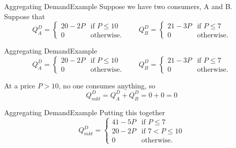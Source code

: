 \documentclass[12pt,t]{beamer}
\begin{document}
\begin{frame}{Aggregating Demand}{Example}
  Suppose we have two consumers, A and B. Suppose that
  $$
    Q_A^D =
    \begin{cases}
      20 - 2P & \text{if } P \leq 10 \\
      0       & \text{otherwise}.
    \end{cases}
    \quad\quad
    Q_B^D =
    \begin{cases}
      21 - 3P & \text{if } P  \leq 7 \\
      0       & \text{otherwise}.
    \end{cases}
  $$

  \bigskip
\end{frame}

\begin{frame}{Aggregating Demand}{Example}
  $$
    Q_A^D =
    \begin{cases}
      20 - 2P & \text{if } P \leq 10 \\
      0       & \text{otherwise}.
    \end{cases}
    \quad\quad
    Q_B^D =
    \begin{cases}
      21 - 3P & \text{if } P  \leq 7 \\
      0       & \text{otherwise}.
    \end{cases}
  $$

  \vspace{10mm}


   {
    At a price $P > 10$, no one consumes anything, so 
    $$Q^D_{mkt} = Q_A^D + Q_B^D = 0 + 0 = 0$$ 
  }
\end{frame}

\begin{frame}{Aggregating Demand}{Example}
  Putting this together
  $$
    Q_{mkt}^D =
    \begin{cases}
      41 - 5P & \text{if } P \leq 7      \\
      20 - 2P & \text{if } 7 < P \leq 10 \\
      0       & \text{otherwise}.
    \end{cases}
  $$
\end{frame}
\end{document}
